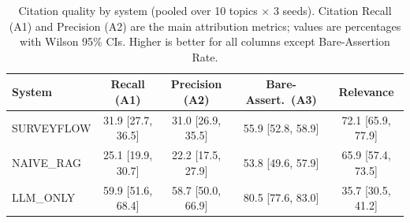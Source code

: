 \begin{table}[t]
\centering
\small
\caption{Citation quality by system (pooled over 10 topics $\times$ 3 seeds). Citation Recall (A1) and Precision (A2) are the main attribution metrics; values are percentages with Wilson 95\% CIs. Higher is better for all columns except Bare-Assertion Rate.}
\label{tab:citation-main}
\begin{tabular}{lcccc}
\toprule
System & Recall (A1) & Precision (A2) & Bare-Assert.\ (A3) & Relevance \\
\midrule
SURVEYFLOW & 31.9 [27.7, 36.5] & 31.0 [26.9, 35.5] & 55.9 [52.8, 58.9] & 72.1 [65.9, 77.9] \\
NAIVE_RAG & 25.1 [19.9, 30.7] & 22.2 [17.5, 27.9] & 53.8 [49.6, 57.9] & 65.9 [57.4, 73.5] \\
LLM_ONLY & 59.9 [51.6, 68.4] & 58.7 [50.0, 66.9] & 80.5 [77.6, 83.0] & 35.7 [30.5, 41.2] \\
\bottomrule
\end{tabular}
\end{table}